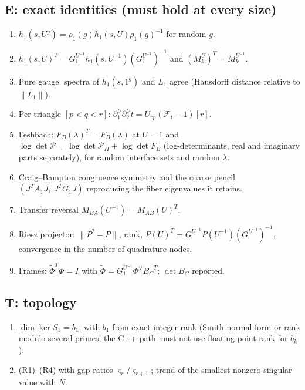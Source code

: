 \documentclass[11pt]{article}
\theoremstyle{definition}
\theoremstyle{plain}
\theoremstyle{remark}
\newcommand{\bd}{\partial}
\newcommand{\Tr}{^{T}}
\begin{document}
\subsection*{E: exact identities (must hold at every size)}
\begin{enumerate}[nosep,label=E\arabic*.]
\item \(h_1(s,U^{g})=\rho_1(g)h_1(s,U)\rho_1(g)^{-1}\) for random \(g\).
\item \(h_1(s,U)\Tr=G_1^{U^{-1}}h_1(s,U^{-1})(G_1^{U^{-1}})^{-1}\) and \((M_k^{U})\Tr=M_k^{U^{-1}}\).
\item Pure gauge: spectra of \(h_1(s,1^{g})\) and \(L_1\) agree (Hausdorff distance relative to \(\|L_1\|\)).
\item Per triangle \([p<q<r]\): \(\bd_1^{U}\bd_2^{U}t=U_{rp}(\mathcal F_t-1)[r]\).
\item Feshbach: \(F_B(\lambda)\Tr=F_B(\lambda)\) at \(U=1\) and \(\log\det\mathcal P=\log\det\mathcal P_{II}+\log\det F_B\) (log-determinants, real and imaginary parts separately), for random interface sets and random \(\lambda\).
\item Craig--Bampton congruence symmetry and the coarse pencil \((J\Tr A_1J,\ J\Tr G_1J)\) reproducing the fiber eigenvalues it retains.
\item Transfer reversal \(M_{BA}(U^{-1})=M_{AB}(U)\Tr\).
\item Riesz projector: \(\|P^2-P\|\), rank, \(P(U)\Tr=G^{U^{-1}}P(U^{-1})(G^{U^{-1}})^{-1}\), convergence in the number of quadrature nodes.
\item Frames: \(\widetilde\Phi\Tr\Phi=I\) with \(\widetilde\Phi=G_1^{U^{-1}}\Phi^{\vee}B_C^{-T}\); \(\det B_C\) reported.
\end{enumerate}

\subsection*{T: topology}
\begin{enumerate}[nosep,label=T\arabic*.]
\item \(\dim\ker S_1=b_1\), with \(b_1\) from exact integer rank (Smith normal form or rank modulo several primes; the C++ path must not use floating-point rank for \(b_k\)).
\item (R1)--(R4) with gap ratios \(\varsigma_r/\varsigma_{r+1}\); trend of the smallest nonzero singular value with \(N\).
\end{enumerate}
\end{document}
